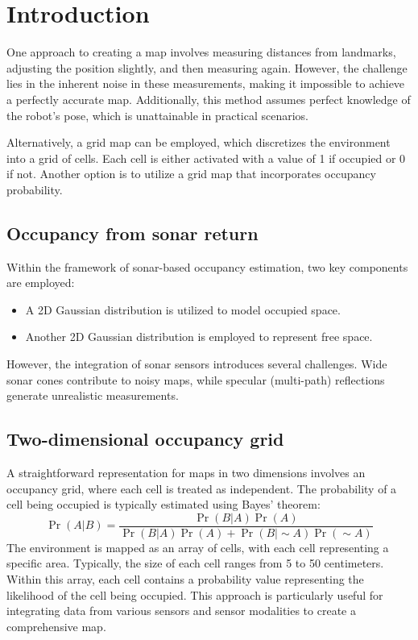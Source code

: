 \section{Introduction}

One approach to creating a map involves measuring distances from landmarks, adjusting the position slightly, and then measuring again. 
However, the challenge lies in the inherent noise in these measurements, making it impossible to achieve a perfectly accurate map. 
Additionally, this method assumes perfect knowledge of the robot's pose, which is unattainable in practical scenarios.

Alternatively, a grid map can be employed, which discretizes the environment into a grid of cells. 
Each cell is either activated with a value of 1 if occupied or 0 if not. 
Another option is to utilize a grid map that incorporates occupancy probability.

\subsection{Occupancy from sonar return}
Within the framework of sonar-based occupancy estimation, two key components are employed:
\begin{itemize}
    \item A 2D Gaussian distribution is utilized to model occupied space.
    \item Another 2D Gaussian distribution is employed to represent free space.
\end{itemize}
However, the integration of sonar sensors introduces several challenges. 
Wide sonar cones contribute to noisy maps, while specular (multi-path) reflections generate unrealistic measurements.

\subsection{Two-dimensional occupancy grid}
A straightforward representation for maps in two dimensions involves an occupancy grid, where each cell is treated as independent.
The probability of a cell being occupied is typically estimated using Bayes' theorem: 
\[\Pr(A|B)=\dfrac{\Pr(B|A)\Pr(A)}{\Pr(B|A)\Pr(A)+\Pr(B|\sim A)\Pr(\sim A)}\]
The environment is mapped as an array of cells, with each cell representing a specific area. 
Typically, the size of each cell ranges from 5 to 50 centimeters. 
Within this array, each cell contains a probability value representing the likelihood of the cell being occupied. 
This approach is particularly useful for integrating data from various sensors and sensor modalities to create a comprehensive map.

